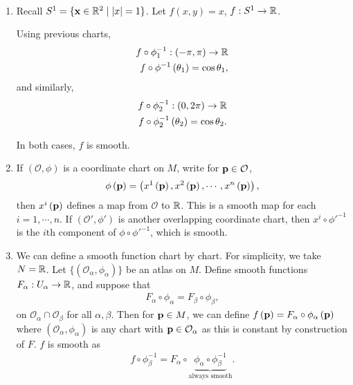 \begin{examples}~
    \begin{enumerate}[label=\arabic*)]
        \item Recall $S^{1} = \{\vb{x} \in \mathbb{R}^2  \mid  \left| x \right| = 1\} $. Let $f\left( x,y \right) = x$, $f : S^{1} \to \mathbb{R}$.

            Using previous charts,
            \begin{align}
                f \circ \phi_1^{-1} : \left( -\pi, \pi \right) \to \mathbb{R} \\
                f \circ \phi^{-1}\left( \theta_1 \right) = \cos \theta_1
            ,\end{align}
            and similarly,
            \begin{align}
                f \circ \phi_2^{-1} : \left( 0, 2\pi \right) \to \mathbb{R} \\
                f \circ \phi_2^{-1} \left( \theta_2 \right) = \cos \theta_2
            .\end{align}

            In both cases, $f$ is smooth.

        \item If $\left( \mathcal{O}, \phi \right) $ is a coordinate chart on $M$, write for $\vb{p} \in \mathcal{O}$,
            \begin{align}
                \phi \left( \vb{p} \right) = \left( x^{1}\left( \vb{p} \right), x^{2}\left( \vb{p} \right) , \cdots, x^{n}\left( \vb{p} \right)   \right) 
            ,\end{align}
            then $x^{i}\left( \vb{p} \right) $ defines a map from $\mathcal{O}$ to $\mathbb{R}$. This is a smooth map for each $i = 1, \cdots, n$. If $\left( \mathcal{O}', \phi' \right) $ is another overlapping coordinate chart, then $x^{i} \circ \phi'^{-1}$ is the $i$th component of $\phi \circ \phi'^{-1}$, which is smooth.

        \item We can define a smooth function chart by chart. For simplicity, we take $N = \mathbb{R}$. Let $\{\left( \mathcal{O}_\alpha, \phi_\alpha \right) \} $ be an atlas on $M$. Define smooth functions $F_{\alpha} : U_{\alpha} \to \mathbb{R}$, and suppose that
            \begin{align}
                F_{\alpha} \circ \phi_{\alpha} = F_{\beta} \circ \phi_{\beta}
            ,\end{align}
            on $\mathcal{O}_\alpha \cap \mathcal{O}_{\beta}$ for all $\alpha, \beta$. Then for $\vb{p} \in M$, we can define $f\left( \vb{p} \right) = F_{\alpha} \circ \phi_{\alpha}\left( \vb{p} \right) $ where $\left( \mathcal{O}_{\alpha}, \phi_{\alpha} \right) $ is any chart with $\vb{p} \in \mathcal{O}_{\alpha}$ as this is constant by construction of $F$. $f$ is smooth as
            \begin{align}
                f \circ \phi_\beta^{-1} = F_\alpha \circ \underbrace{\phi_\alpha \circ \phi_\beta^{-1}}_{\text{always smooth}}
            .\end{align}


\end{enumerate}
\end{examples}
